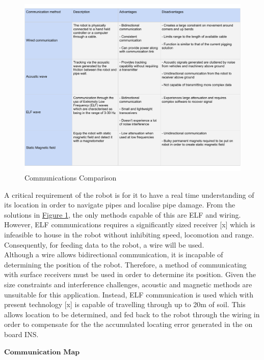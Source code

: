 \documentclass[11pt]{article}		%
\begin{document}
        \begin{figure}[h]
			\centering
			\includegraphics[scale=0.6]{commstable.pdf}
			\caption{Communications Comparison}
			\label{commsTable}
		\end{figure}
     	A critical requirement of the robot is for it to have a real time understanding of its location in order to navigate pipes and localise pipe damage. 
     	From the solutions in \hyperref[commsTable]{Figure \ref*{commsTable}}, the only methods capable of this are ELF and wiring. 
     	However, ELF communications requires a significantly sized receiver [x] which is infeasible to house in the robot without inhibiting speed, locomotion and range. 
     	Consequently, for feeding data to the robot, a wire will be used.
        \\ 
        \hspace*{3ex}Although a wire allows bidirectional communication, it is incapable of determining the position of the robot. 
        Therefore, a method of communicating with surface receivers must be used in order to determine its position. 
        Given the size constraints and interference challenges, acoustic and magnetic methods are unsuitable for this application. 
        Instead, ELF communication is used which with present technology [x] is capable of travelling through up to 20m of soil. 
        This allows location to be determined, and fed back to the robot through the wiring in order to compensate for the the accumulated locating error generated in the on board INS.
         
        $\textbf{Communication Map}$
        
\end{document}
